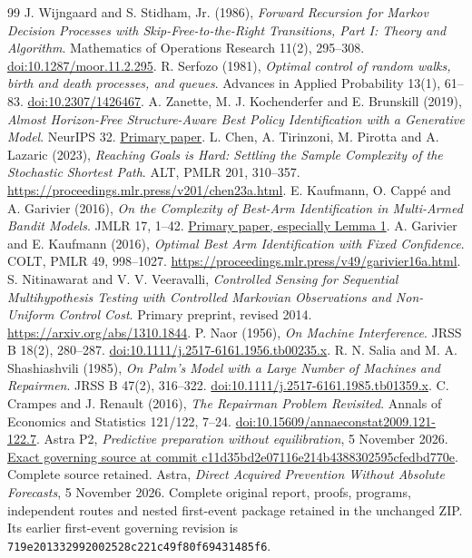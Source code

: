 \documentclass[10pt,a4paper]{article}
\begin{document}
\begin{thebibliography}{99}
 J. Wijngaard and S. Stidham, Jr. (1986), \emph{Forward Recursion for Markov Decision Processes with Skip-Free-to-the-Right Transitions, Part I: Theory and Algorithm}. Mathematics of Operations Research 11(2), 295--308. \href{https://doi.org/10.1287/moor.11.2.295}{doi:10.1287/moor.11.2.295}.
 R. Serfozo (1981), \emph{Optimal control of random walks, birth and death processes, and queues}. Advances in Applied Probability 13(1), 61--83. \href{https://doi.org/10.2307/1426467}{doi:10.2307/1426467}.
 A. Zanette, M. J. Kochenderfer and E. Brunskill (2019), \emph{Almost Horizon-Free Structure-Aware Best Policy Identification with a Generative Model}. NeurIPS 32. \href{https://papers.neurips.cc/paper_files/paper/2019/file/a724b9124acc7b5058ed75a31a9c2919-Paper.pdf}{Primary paper}.
 L. Chen, A. Tirinzoni, M. Pirotta and A. Lazaric (2023), \emph{Reaching Goals is Hard: Settling the Sample Complexity of the Stochastic Shortest Path}. ALT, PMLR 201, 310--357. \url{https://proceedings.mlr.press/v201/chen23a.html}.
 E. Kaufmann, O. Capp\'e and A. Garivier (2016), \emph{On the Complexity of Best-Arm Identification in Multi-Armed Bandit Models}. JMLR 17, 1--42. \href{https://www.jmlr.org/papers/volume17/kaufman16a/kaufman16a.pdf}{Primary paper, especially Lemma 1}.
 A. Garivier and E. Kaufmann (2016), \emph{Optimal Best Arm Identification with Fixed Confidence}. COLT, PMLR 49, 998--1027. \url{https://proceedings.mlr.press/v49/garivier16a.html}.
 S. Nitinawarat and V. V. Veeravalli, \emph{Controlled Sensing for Sequential Multihypothesis Testing with Controlled Markovian Observations and Non-Uniform Control Cost}. Primary preprint, revised 2014. \url{https://arxiv.org/abs/1310.1844}.
 P. Naor (1956), \emph{On Machine Interference}. JRSS B 18(2), 280--287. \href{https://doi.org/10.1111/j.2517-6161.1956.tb00235.x}{doi:10.1111/j.2517-6161.1956.tb00235.x}.
 R. N. Salia and M. A. Shashiashvili (1985), \emph{On Palm's Model with a Large Number of Machines and Repairmen}. JRSS B 47(2), 316--322. \href{https://doi.org/10.1111/j.2517-6161.1985.tb01359.x}{doi:10.1111/j.2517-6161.1985.tb01359.x}.
 C. Crampes and J. Renault (2016), \emph{The Repairman Problem Revisited}. Annals of Economics and Statistics 121/122, 7--24. \href{https://doi.org/10.15609/annaeconstat2009.121-122.7}{doi:10.15609/annaeconstat2009.121-122.7}.
 Astra P2, \emph{Predictive preparation without equilibration}, 5 November 2026. \href{https://github.com/harjassand/astra-research-knowledge/blob/c11d35bd2e07116e214b4388302595cfedbd770e/research/returns/2026-11-05-p2-predictive-preparation/package/predictive_preparation.md}{Exact governing source at commit c11d35bd2e07116e214b4388302595cfedbd770e}. Complete source retained.
 Astra, \emph{Direct Acquired Prevention Without Absolute Forecasts}, 5 November 2026. Complete original report, proofs, programs, independent routes and nested first-event package retained in the unchanged ZIP. Its earlier first-event governing revision is \texttt{719e201332992002528c221c49f80f69431485f6}.
\end{thebibliography}
\end{document}
